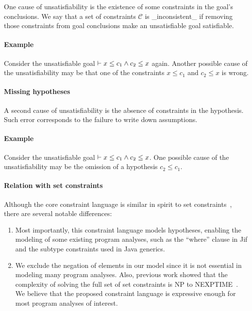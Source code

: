 One cause of unsatisfiability is the existence of some constraints
in the goal's conclusions. We say that a set of constraints
$\mathcal{C}$ is _inconsistent_ if removing those constraints from
goal conclusions make an unsatisfiable goal satisfiable.

\paragraph{Example}

Consider the unsatisfiable goal $\vdash x \leq c_1 \land c_2 \leq x$
again. Another possible cause of the unsatisfiability may be that one
of the constraints $x \leq c_1$ and $c_2 \leq x$ is wrong. 

\paragraph{Missing hypotheses}

A second cause of unsatisfiability is the absence of constraints in
the hypothesis. Such error corresponds to the failure to write down
assumptions.

\paragraph{Example}
Consider the unsatisfiable goal $\vdash x \leq c_1 \land c_2 \leq x$.
One possible cause of the unsatisfiability may be the omission of a
hypothesis $c_2\leq c_1$.

\paragraph{Relation with set constraints}

Although the core constraint language is similar in spirit to set
constraints~\cite{aiken-setconstraint}, there are several notable
differences:

\begin{enumerate}

\item Most importantly, this constraint language models hypotheses,
enabling the modeling of some existing program analyses, such as the
``where'' clause in Jif and the subtype constraints used in Java
generics.

\item We exclude the negation of elements in our model since it is not
essential in modeling many program analyses. Also, previous work
showed that the complexity of solving the full set of set constraints
is NP to NEXPTIME~\cite{aiken-complexity}. We believe that the
proposed constraint language is expressive enough for most program
analyses of interest.

\end{enumerate}
\fi

